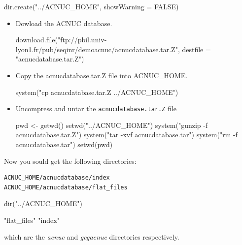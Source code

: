 \documentclass{article}
\begin{document}
\begin{Schunk}
\begin{Sinput}
 dir.create("../ACNUC_HOME", showWarning = FALSE)
\end{Sinput}
\end{Schunk}

\begin{itemize}
\item Dowload the ACNUC database.

\begin{Schunk}
\begin{Sinput}
 download.file("ftp://pbil.univ-lyon1.fr/pub/seqinr/demoacnuc/acnucdatabase.tar.Z", 
     destfile = "acnucdatabase.tar.Z")
\end{Sinput}
\end{Schunk}

\item Copy the  acnucdatabase.tar.Z file  into ACNUC\_HOME.

\begin{Schunk}
\begin{Sinput}
 system("cp acnucdatabase.tar.Z ../ACNUC_HOME")
\end{Sinput}
\end{Schunk}

\item Uncompress and untar the \texttt{acnucdatabase.tar.Z} file 

\begin{Schunk}
\begin{Sinput}
 pwd <- getwd()
 setwd("../ACNUC_HOME")
 system("gunzip -f acnucdatabase.tar.Z")
 system("tar -xvf acnucdatabase.tar")
 system("rm -f acnucdatabase.tar")
 setwd(pwd)
\end{Sinput}
\end{Schunk}

\end{itemize}
Now you sould get the following directories:
\begin{verbatim}
ACNUC_HOME/acnucdatabase/index
ACNUC_HOME/acnucdatabase/flat_files
\end{verbatim}

\begin{Schunk}
\begin{Sinput}
 dir("../ACNUC_HOME")
\end{Sinput}
\begin{Soutput}
[1] "flat_files" "index"     
\end{Soutput}
\end{Schunk}
which are the   \textit{acnuc} and  \textit{gcgacnuc} directories  respectively.
\end{document}
